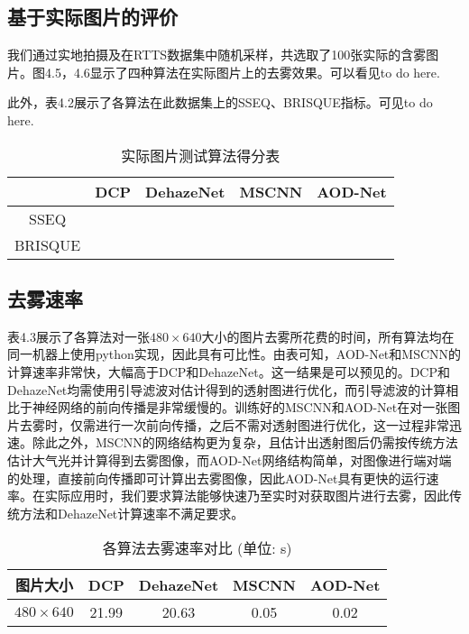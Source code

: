 \documentclass[a4paper, 12pt, oneside]{report}
\begin{document}
{\subsection{基于实际图片的评价\quad}
我们通过实地拍摄及在RTTS数据集中随机采样，共选取了100张实际的含雾图片。图4.5，4.6显示了四种算法在实际图片上的去雾效果。可以看见to do here.

此外，表4.2展示了各算法在此数据集上的SSEQ、BRISQUE指标。可见to do here.
\begin{table}[htbp]
  \centering
  \caption{实际图片测试算法得分表}
    \begin{tabular}{c|c|c|c|c}
    \hline
         & DCP    & DehazeNet  & MSCNN    & AOD-Net  \\
    \hline
    SSEQ &   &  &     &  \\
    \hline
     BRISQUE     &       &       &   & \\
     \hline
  
    \end{tabular}%
  \label{tab:4.2}%
\end{table}%

\subsection{去雾速率\quad}
表4.3展示了各算法对一张$480 \times 640$大小的图片去雾所花费的时间，所有算法均在同一机器上使用python实现，因此具有可比性。由表可知，AOD-Net和MSCNN的计算速率非常快，大幅高于DCP和DehazeNet。这一结果是可以预见的。DCP和DehazeNet均需使用引导滤波对估计得到的透射图进行优化，而引导滤波的计算相比于神经网络的前向传播是非常缓慢的。训练好的MSCNN和AOD-Net在对一张图片去雾时，仅需进行一次前向传播，之后不需对透射图进行优化，这一过程非常迅速。除此之外，MSCNN的网络结构更为复杂，且估计出透射图后仍需按传统方法估计大气光并计算得到去雾图像，而AOD-Net网络结构简单，对图像进行端对端的处理，直接前向传播即可计算出去雾图像，因此AOD-Net具有更快的运行速率。在实际应用时，我们要求算法能够快速乃至实时对获取图片进行去雾，因此传统方法和DehazeNet计算速率不满足要求。

\begin{table}[htbp]
\centering
\caption{各算法去雾速率对比 (单位: s)}
\begin{tabular}{c|c|c|c|c}
\hline
图片大小 & DCP & DehazeNet	& MSCNN	& AOD-Net \\
\hline
$480\times  640$ & 21.99 & 20.63 & 0.05 & 0.02\\
\hline
\end{tabular}
\label{tab: 4.3}
\end{table}

}
\end{document}

